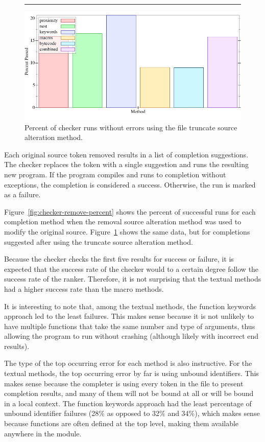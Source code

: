 \documentclass[ms,electronic,twosidetoc,letterpaper,chaptercenter,parttop,lol,lof,lot]{byumsphd}
\begin{document}
\begin{figure}[h]
\centering
\hrule
\includegraphics[width=1.0\textwidth]{../output/synthesis/checker/Truncate-Percent.png}
\caption{Percent of checker runs without errors using the file truncate source alteration method.}
\label{fig:checker-truncate-percent}
\end{figure}

Each original source token removed results in a list of completion suggestions.
The checker replaces the token with a single suggestion and runs the resulting new program.
If the program compiles and runs to completion without exceptions, the completion is considered a success.
Otherwise, the run is marked as a failure.

Figure~\ref{fig:checker-remove-percent} shows the percent of successful runs for each completion method when the removal source alteration method was used to modify the original source.
Figure~\ref{fig:checker-truncate-percent} shows the same data, but for completions suggested after using the truncate source alteration method.

Because the checker checks the first five results for success or failure, it is expected that the success rate of the checker would to a certain degree follow the success rate of the ranker.
Therefore, it is not surprising that the textual methods had a higher success rate than the macro methods.

It is interesting to note that, among the textual methods, the function keywords approach led to the least failures.
This makes sense because it is not unlikely to have multiple functions that take the same number and type of arguments, thus allowing the program to run without crashing (although likely with incorrect end results).

The type of the top occurring error for each method is also instructive.
For the textual methods, the top occurring error by far is using unbound identifiers.
This makes sense because the completer is using every token in the file to present completion results, and many of them will not be bound at all or will be bound in a local context.
The function keywords approach had the least percentage of unbound identifier failures (28\% as opposed to 32\% and 34\%), which makes sense because functions are often defined at the top level, making them available anywhere in the module.
\end{document}
